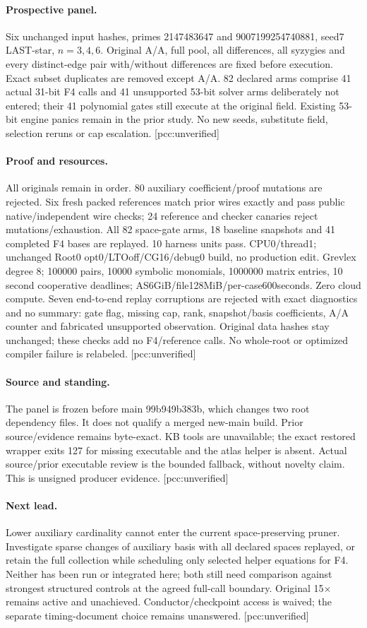 \documentclass[10pt,a4paper]{article}
\begin{document}
\paragraph{Prospective panel.} Six unchanged input hashes, primes 2147483647
and 9007199254740881, seed7 LAST-star, $n=3,4,6$. Original A/A, full pool, all
differences, all syzygies and every distinct-edge pair with/without differences
are fixed before execution. Exact subset duplicates are removed except A/A.
82 declared arms comprise 41 actual 31-bit F4 calls and 41 unsupported 53-bit solver arms
deliberately not entered; their 41 polynomial gates still execute at the original
field. Existing 53-bit engine panics remain in the prior study. No new seeds,
substitute field, selection reruns or cap escalation. [pcc:unverified]
\paragraph{Proof and resources.} All originals remain in order. 80 auxiliary
coefficient/proof mutations are rejected. Six fresh packed references match
prior wires exactly and pass public native/independent wire checks; 24 reference
and checker canaries reject mutations/exhaustion. All 82 space-gate arms,
18 baseline snapshots and 41 completed F4 bases are replayed. 10 harness units pass.
CPU0/thread1; unchanged Root0 opt0/LTOoff/CG16/debug0 build, no production edit.
Grevlex degree 8; 100000 pairs, 10000 symbolic monomials, 1000000 matrix entries,
10 second cooperative deadlines; AS6GiB/file128MiB/per-case600seconds. Zero
cloud compute. Seven end-to-end replay corruptions are rejected with exact
diagnostics and no summary: gate flag, missing cap, rank, snapshot/basis
coefficients, A/A counter and fabricated unsupported observation. Original
data hashes stay unchanged; these checks add no F4/reference calls. No
whole-root or optimized compiler failure is relabeled. [pcc:unverified]
\paragraph{Source and standing.} The panel is frozen before main 99b949b383b,
which changes two root dependency files. It does not qualify a merged new-main
build. Prior source/evidence remains byte-exact. KB tools are unavailable;
the exact restored wrapper exits 127 for missing executable and the atlas helper
is absent. Actual source/prior executable review is the bounded fallback,
without novelty claim. This is unsigned producer evidence. [pcc:unverified]
\paragraph{Next lead.} Lower auxiliary cardinality cannot enter the current
space-preserving pruner. Investigate sparse changes of auxiliary basis with
all declared spaces replayed, or retain the full collection while scheduling
only selected helper equations for F4. Neither has been run or integrated here;
both still need comparison against strongest structured controls at the agreed
full-call boundary. Original 15$\times$ remains active and unachieved.
Conductor/checkpoint access is waived; the separate timing-document choice
remains unanswered. [pcc:unverified]
\end{document}
